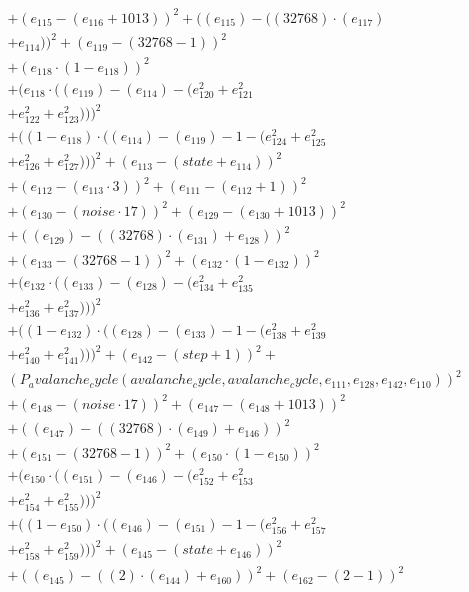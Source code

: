 \documentclass[10pt, a4paper]{article}
\begin{document}
\begin{small}
\begin{align*}
& + (e_{115} - (e_{116} + 1013))^{2} + ((e_{115}) - ((32768)  \cdot  (e_{117}) \\
& + e_{114}))^{2} + (e_{119} - (32768 - 1))^{2} \\
& + (e_{118}  \cdot  (1 - e_{118}))^{2} \\
& + (e_{118}  \cdot  ((e_{119}) - (e_{114}) - (e_{120}^{2} + e_{121}^{2} \\
& + e_{122}^{2} + e_{123}^{2})))^{2} \\
& + ((1 - e_{118})  \cdot  ((e_{114}) - (e_{119}) - 1 - (e_{124}^{2} + e_{125}^{2} \\
& + e_{126}^{2} + e_{127}^{2})))^{2} + (e_{113} - (state + e_{114}))^{2} \\
& + (e_{112} - (e_{113}  \cdot  3))^{2} + (e_{111} - (e_{112} + 1))^{2} \\
& + (e_{130} - (noise  \cdot  17))^{2} + (e_{129} - (e_{130} + 1013))^{2} \\
& + ((e_{129}) - ((32768)  \cdot  (e_{131}) + e_{128}))^{2} \\
& + (e_{133} - (32768 - 1))^{2} + (e_{132}  \cdot  (1 - e_{132}))^{2} \\
& + (e_{132}  \cdot  ((e_{133}) - (e_{128}) - (e_{134}^{2} + e_{135}^{2} \\
& + e_{136}^{2} + e_{137}^{2})))^{2} \\
& + ((1 - e_{132})  \cdot  ((e_{128}) - (e_{133}) - 1 - (e_{138}^{2} + e_{139}^{2} \\
& + e_{140}^{2} + e_{141}^{2})))^{2} + (e_{142} - (step + 1))^{2} + \\
& (P_avalanche_cycle(avalanche_cycle, avalanche_cycle, e_{111}, e_{128}, e_{142}, e_{110}))^{2} \\
& + (e_{148} - (noise  \cdot  17))^{2} + (e_{147} - (e_{148} + 1013))^{2} \\
& + ((e_{147}) - ((32768)  \cdot  (e_{149}) + e_{146}))^{2} \\
& + (e_{151} - (32768 - 1))^{2} + (e_{150}  \cdot  (1 - e_{150}))^{2} \\
& + (e_{150}  \cdot  ((e_{151}) - (e_{146}) - (e_{152}^{2} + e_{153}^{2} \\
& + e_{154}^{2} + e_{155}^{2})))^{2} \\
& + ((1 - e_{150})  \cdot  ((e_{146}) - (e_{151}) - 1 - (e_{156}^{2} + e_{157}^{2} \\
& + e_{158}^{2} + e_{159}^{2})))^{2} + (e_{145} - (state + e_{146}))^{2} \\
& + ((e_{145}) - ((2)  \cdot  (e_{144}) + e_{160}))^{2} + (e_{162} - (2 - 1))^{2} \\

\end{align*}
\end{small}
\end{document}
